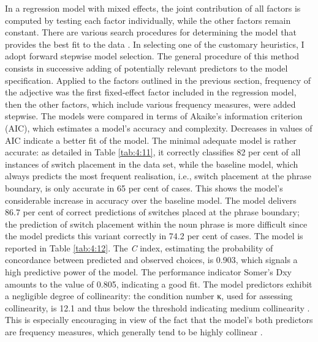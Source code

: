 In a regression model with mixed effects, the joint contribution of all factors is computed by testing each factor individually, while the other factors remain constant. There are various search procedures for determining the model that provides the best fit to the data \citep[cf.][]{baayen-2013}. In selecting one of the customary heuristics, I adopt forward stepwise model selection. The general procedure of this method consists in successive adding of potentially relevant predictors to the model specification. Applied to the factors outlined in the previous section, frequency of the adjective was the first fixed-effect factor included in the regression model, then the other factors, which include various frequency measures, were added stepwise. The models were compared in terms of Akaike's information criterion (AIC), which estimates a model's accuracy and complexity. Decreases in values of AIC indicate a better fit of the model. The minimal adequate model is rather accurate: as detailed in Table \ref{tab:4:11}, it correctly classifies 82 per cent of all instances of switch placement in the data set, while the baseline model, which always predicts the most frequent realisation, i.e., switch placement at the phrase boundary, is only accurate in 65 per cent of cases. This shows the model's considerable increase in accuracy over the baseline model. The model delivers 86.7 per cent of correct predictions of switches placed at the phrase boundary; the prediction of switch placement within the noun phrase is more difficult since the model predicts this variant correctly in 74.2 per cent of cases. The  model is reported in Table \ref{tab:4:12}. The \textit{C} index, estimating the probability of concordance between predicted and observed choices, is 0.903, which signals a high predictive power of the model. The performance indicator Somer's Dxy amounts to the value of 0.805, indicating a good fit. The model predictors exhibit a negligible degree of collinearity: the condition number κ, used for assessing collinearity, is 12.1 and thus below the threshold indicating medium collinearity \citep[cf.][182]{baayen-analyzing}. This is especially encouraging in view of the fact that the model's both predictors are frequency measures, which generally tend to be highly collinear \citep{baayen-2013}.

